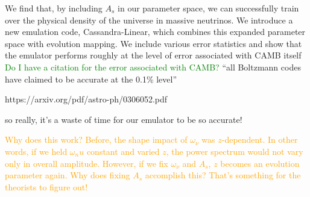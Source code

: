 We find that, by including $A_s$ in our parameter space, we can successfully 
train over the physical density of the universe in massive neutrinos. We introduce a new emulation code,
Cassandra-Linear, which combines this expanded parameter space with evolution
mapping. We include various error statistics and show that the emulator
performs roughly at the level of error associated with CAMB itself
\textcolor{green}{Do I have a citation for the error associated with CAMB?}
``all Boltzmann codes have claimed to be accurate at the 0.1\% level''

https://arxiv.org/pdf/astro-ph/0306052.pdf

so really, it's a waste of time for our emulator to be so accurate!

\textcolor{orange}{Why does this work? Before, the shape impact of
$\omega_\nu$ 
was $z$-dependent. In other words, if we held $\omega_nu$ constant and varied
$z$, the power spectrum would not vary only in overall amplitude. However, if
we fix $\omega_\nu$ and $A_s$, $z$ becomes an evolution parameter again. Why
does fixing $A_s$ accomplish this? That's something for the theorists to 
figure out!}
